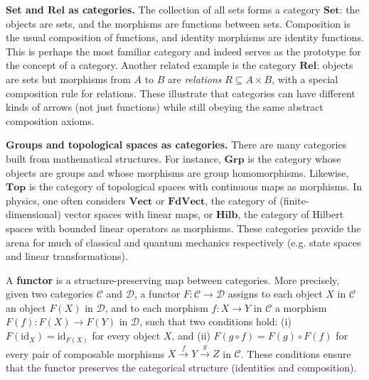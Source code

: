 \vspace{1em}
\begin{example}\label{ex:Set-cat}
\textbf{Set and $\mathbf{Rel}$ as categories.} The collection of all sets forms a category $\mathbf{Set}$: the objects are sets, and the morphisms are functions between sets. Composition is the usual composition of functions, and identity morphisms are identity functions. This is perhaps the most familiar category and indeed serves as the prototype for the concept of a category. Another related example is the category $\mathbf{Rel}$: objects are sets but morphisms from $A$ to $B$ are \emph{relations} $R \subseteq A\times B$, with a special composition rule for relations. These illustrate that categories can have different kinds of arrows (not just functions) while still obeying the same abstract composition axioms.
\end{example}

\vspace{1em}
\begin{example}\label{ex:Grp-cat}
\textbf{Groups and topological spaces as categories.} There are many categories built from mathematical structures. For instance, $\mathbf{Grp}$ is the category whose objects are groups and whose morphisms are group homomorphisms. Likewise, $\mathbf{Top}$ is the category of topological spaces with continuous maps as morphisms. In physics, one often considers $\mathbf{Vect}$ or $\mathbf{FdVect}$, the category of (finite-dimensional) vector spaces with linear maps, or $\mathbf{Hilb}$, the category of Hilbert spaces with bounded linear operators as morphisms. These categories provide the arena for much of classical and quantum mechanics respectively (e.g. state spaces and linear transformations).
\end{example}

\vspace{1em}
A \textbf{functor} is a structure-preserving map between categories. More precisely, given two categories $\mathcal{C}$ and $\mathcal{D}$, a functor $F: \mathcal{C} \to \mathcal{D}$ assigns to each object $X$ in $\mathcal{C}$ an object $F(X)$ in $\mathcal{D}$, and to each morphism $f: X \to Y$ in $\mathcal{C}$ a morphism $F(f): F(X) \to F(Y)$ in $\mathcal{D}$, such that two conditions hold: (i) $F(\mathrm{id}_X) = \mathrm{id}_{F(X)}$ for every object $X$, and (ii) $F(g\circ f) = F(g)\circ F(f)$ for every pair of composable morphisms $X \xrightarrow{f} Y \xrightarrow{g} Z$ in $\mathcal{C}$. These conditions ensure that the functor preserves the categorical structure (identities and composition).

